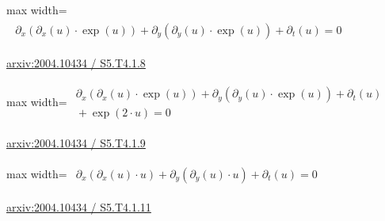 \documentclass[10pt,a4paper]{article}
\begin{document}
\begin{minipage}{\linewidth}
\begin{center}\begin{adjustbox}{max width=\linewidth}$\displaystyle\begin{gathered}\begin{gathered}\partial_{x}(\partial_{x}(u)\cdot \exp(u))+\partial_{y}(\partial_{y}(u)\cdot \exp(u))+\partial_{t}(u)=0\end{gathered}\end{gathered}$\end{adjustbox}\end{center}
{\small \href{https://arxiv.org/html/2004.10434#S5.T4.1.8}{arxiv:2004.10434 / S5.T4.1.8}}\par
\end{minipage}\par\vspace{7mm}

\begin{minipage}{\linewidth}
\begin{center}\begin{adjustbox}{max width=\linewidth}$\displaystyle\begin{gathered}\begin{gathered}\partial_{x}(\partial_{x}(u)\cdot \exp(u))+\partial_{y}(\partial_{y}(u)\cdot \exp(u))+\partial_{t}(u)\\[-1pt]{}+\exp(2\cdot u)=0\end{gathered}\end{gathered}$\end{adjustbox}\end{center}
{\small \href{https://arxiv.org/html/2004.10434#S5.T4.1.9}{arxiv:2004.10434 / S5.T4.1.9}}\par
\end{minipage}\par\vspace{7mm}

\begin{minipage}{\linewidth}
\begin{center}\begin{adjustbox}{max width=\linewidth}$\displaystyle\begin{gathered}\begin{gathered}\partial_{x}(\partial_{x}(u)\cdot u)+\partial_{y}(\partial_{y}(u)\cdot u)+\partial_{t}(u)=0\end{gathered}\end{gathered}$\end{adjustbox}\end{center}
{\small \href{https://arxiv.org/html/2004.10434#S5.T4.1.11}{arxiv:2004.10434 / S5.T4.1.11}}\par
\end{minipage}\par\vspace{7mm}
\end{document}
